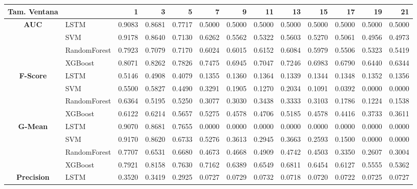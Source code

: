 \begin{table}[h]
\centering
\begin{adjustbox}{max width=15cm}
	\begin{tabular}{|c|l|r|r|r|r|r|r|r|r|r|r|r|}
		\hline
		\textbf{Tam. Ventana} &         &      1  &      3  &      5  &      7  &      9  &      11 &      13 &      15 &      17 &      19 &      21 \\
		\hline
		\textbf{AUC} & LSTM &  0.9083 &  0.8681 &  0.7717 &  0.5000 &  0.5000 &  0.5000 &  0.5000 &  0.5000 &  0.5000 &  0.5000 &  0.5000 \\
		& SVM &  0.9178 &  0.8640 &  0.7130 &  0.6262 &  0.5562 &  0.5322 &  0.5603 &  0.5270 &  0.5061 &  0.4956 &  0.4973 \\
		& RandomForest &  0.7923 &  0.7079 &  0.7170 &  0.6024 &  0.6015 &  0.6152 &  0.6084 &  0.5979 &  0.5506 &  0.5323 &  0.5419 \\
		& XGBoost &  0.8071 &  0.8262 &  0.7826 &  0.7475 &  0.6945 &  0.7047 &  0.7246 &  0.6983 &  0.6790 &  0.6440 &  0.6344 \\
		\hline
		\textbf{F-Score} & LSTM &  0.5146 &  0.4908 &  0.4079 &  0.1355 &  0.1360 &  0.1364 &  0.1339 &  0.1344 &  0.1348 &  0.1352 &  0.1356 \\
		& SVM &  0.5500 &  0.5827 &  0.4490 &  0.3291 &  0.1905 &  0.1270 &  0.2034 &  0.1091 &  0.0392 &  0.0000 &  0.0000 \\
		& RandomForest &  0.6364 &  0.5195 &  0.5250 &  0.3077 &  0.3030 &  0.3438 &  0.3333 &  0.3103 &  0.1786 &  0.1224 &  0.1538 \\
		& XGBoost &  0.6122 &  0.6214 &  0.5657 &  0.5275 &  0.4578 &  0.4706 &  0.5185 &  0.4578 &  0.4416 &  0.3733 &  0.3611 \\
		\hline
		\textbf{G-Mean} & LSTM &  0.9070 &  0.8681 &  0.7655 &  0.0000 &  0.0000 &  0.0000 &  0.0000 &  0.0000 &  0.0000 &  0.0000 &  0.0000 \\
		& SVM &  0.9170 &  0.8620 &  0.6733 &  0.5276 &  0.3613 &  0.2945 &  0.3663 &  0.2593 &  0.1500 &  0.0000 &  0.0000 \\
		& RandomForest &  0.7707 &  0.6531 &  0.6680 &  0.4673 &  0.4668 &  0.4909 &  0.4742 &  0.4503 &  0.3350 &  0.2607 &  0.3004 \\
		& XGBoost &  0.7921 &  0.8158 &  0.7630 &  0.7162 &  0.6389 &  0.6549 &  0.6811 &  0.6454 &  0.6127 &  0.5555 &  0.5362 \\
		\hline
		\textbf{Precision} & LSTM &  0.3520 &  0.3419 &  0.2925 &  0.0727 &  0.0729 &  0.0732 &  0.0718 &  0.0720 &  0.0722 &  0.0725 &  0.0727 \\

\end{tabular}
\end{adjustbox}
\end{table}
